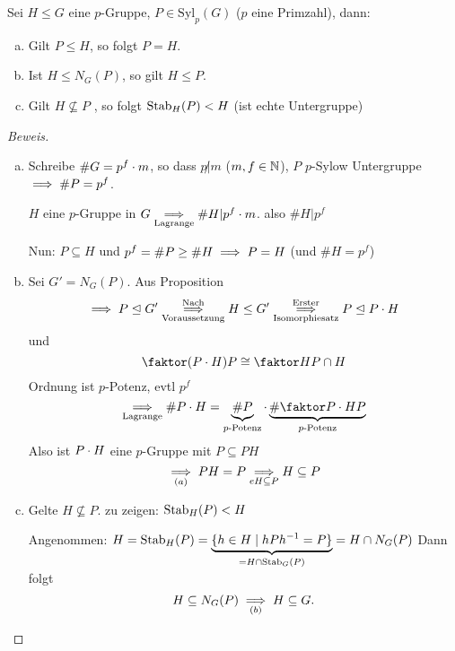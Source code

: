 \documentclass[a4paper]{report}
\begin{document}
\begin{lemm}
  Sei $H \le G$ eine $p$-Gruppe, $P \in \mathrm{Syl}_{p}(G)$ ($p$ eine Primzahl), dann:
  \begin{enumerate}[(a)]
    \item Gilt $P \le H$, so folgt $P = H$.
    \item Ist $H \le N_{G}(P)$, so gilt $H \le P$.
    \item Gilt $H \nsubseteq P$ , so folgt $\operatorname{Stab}_{H}(P) < H$ (ist echte Untergruppe)
  \end{enumerate}
\begin{proof}[Beweis]
  \begin{enumerate}[(a)]
          \item Schreibe $\#G = p^{f}\cdot m$, so dass $p \not | m$ ($m, f \in \mathbb{N}$), $P$ $p$-Sylow Untergruppe $\implies \#P = p^{f}$.

          $H$ eine $p$-Gruppe in $G \underset{\text{Lagrange}}{\implies} \#H | p^{f} \cdot m$. also $\#H | p^{f}$

          Nun: $P \subseteq H$ und $p^{f} = \#P \ge \#H \implies P = H$ (und $\#H = p^{f}$)
    \item Sei $G' = N_{G}(P)$. Aus Proposition
          \[\imp P \nt G' \overunderset{\text{Nach}}{\text{Voraussetzung}}\imp H \le G' \overunderset{\text{Erster}}{\text{Isomorphiesatz}} \imp P \nt P \cd H\] und
          \[\fak {(P \cd H)}{P} \cong \fak H{P \cap H}\]
          Ordnung ist $p$-Potenz, evtl $p^{f}$
          \[\underset{\text{Lagrange}}\imp \#P \cd H = \ubr{\#P}_{p\text{-Potenz}} \cd \ubr{\#\fak{P \cd H}{P}}_{p\text{-Potenz}}\]
          Also ist $P \cdot H$ eine $p$-Gruppe mit $P \subseteq PH$
          \[\underset{(a)} {\implies} PH = P \underset{eH \subseteq P}{\implies} H \subseteq P\]
    \item Gelte $H \nsubseteq P$. zu zeigen: $\operatorname{Stab}_{H}(P) < H$

          Angenommen: $H = \operatorname{Stab}_{H}(P) = \underbrace{\{h \in H \mid hPh^{-1} = P\}}_{=H \cap \operatorname{Stab}_{G}(P)} = H \cap N_{G}(P)$
          Dann folgt
          \[H \subseteq N_{G}(P) \underset{(b)} {\implies} H \subseteq G. \qedhere\]
  \end{enumerate}
\end{proof}
\end{lemm}
\end{document}
